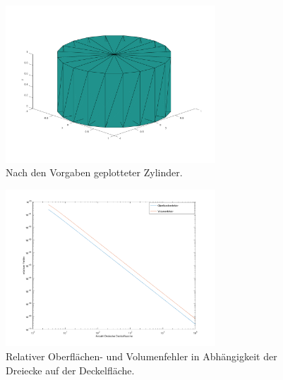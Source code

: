 \documentclass[Protokollheft.tex]{subfiles}
\begin{document}
	\begin{figure}[h]
		\centering
		\includegraphics[trim = 25mm 10mm 25mm 25mm, clip, width=0.7\textwidth]{plotCyl.pdf}
		\caption{Nach den Vorgaben geplotteter Zylinder.}
		\label{Abb:plotCyl}
	\end{figure}
	\begin{figure}[h]
		\centering
		\includegraphics[trim = 25mm 10mm 25mm 15mm, clip, width=0.7\textwidth]{plotVisErrloglog.pdf}
		\caption{Relativer Oberflächen- und Volumenfehler in Abhängigkeit der Dreiecke auf der Deckelfläche.}
		\label{Abb:plotVisErr}
	\end{figure}
	
\end{document}
